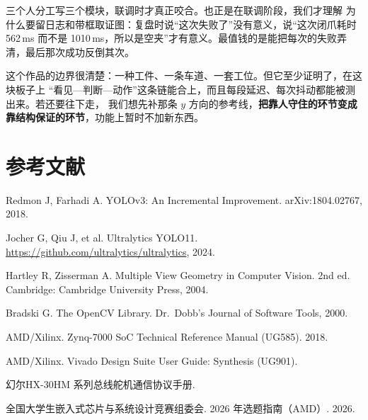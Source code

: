 \documentclass[UTF8,a4paper,zihao=5,fontset=windows]{ctexart}
\begin{document}
三个人分工写三个模块，联调时才真正咬合。也正是在联调阶段，我们才理解
为什么要留日志和带框取证图：复盘时说“这次失败了”没有意义，说“这次闭爪耗时 562\,ms
而不是 1010\,ms，所以是空夹”才有意义。最值钱的是能把每次的失败弄清，最后那次成功反倒其次。

这个作品的边界很清楚：一种工件、一条车道、一套工位。但它至少证明了，在这块板子上
“看见—判断—动作”这条链能合上，而且每段延迟、每次抖动都能被测出来。若还要往下走，
我们想先补那条 $y$ 方向的参考线，\textbf{把靠人守住的环节变成靠结构保证的环节}，功能上暂时不加新东西。

\section{参考文献}

\begin{enumerate}[label={[\arabic*]},leftmargin=2.6em]
  \item Redmon J, Farhadi A. YOLOv3: An Incremental Improvement.
        arXiv:1804.02767, 2018.
  \item Jocher G, Qiu J, et al. Ultralytics YOLO11.
        \url{https://github.com/ultralytics/ultralytics}, 2024.
  \item Hartley R, Zisserman A. Multiple View Geometry in Computer Vision.
        2nd ed. Cambridge: Cambridge University Press, 2004.
  \item Bradski G. The OpenCV Library. Dr.\ Dobb's Journal of Software Tools, 2000.
  \item AMD/Xilinx. Zynq-7000 SoC Technical Reference Manual (UG585). 2018.
  \item AMD/Xilinx. Vivado Design Suite User Guide: Synthesis (UG901).
  \item 幻尔HX-30HM 系列总线舵机通信协议手册.
  \item 全国大学生嵌入式芯片与系统设计竞赛组委会. 2026 年选题指南（AMD）. 2026.
\end{enumerate}

\vspace{4pt}


\newpage
\appendix
\end{document}
